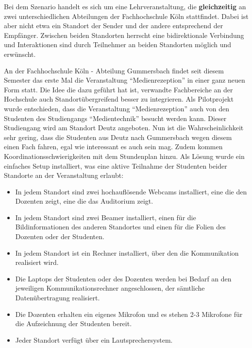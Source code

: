   Bei dem Szenario handelt es sich um eine Lehrveranstaltung, die \textbf{gleichzeitig} an zwei unterschiedlichen Abteilungen der Fachhochschule Köln stattfindet. Dabei ist aber nicht etwa ein Standort der Sender und der andere entsprechend der Empfänger. Zwischen beiden Standorten herrscht eine bidirektionale Verbindung und Interaktionen sind durch Teilnehmer an beiden Standorten möglich und erwünscht.

  An der Fachhochschule Köln - Abteilung Gummersbach findet seit diesem Semester das erste Mal die Veranstaltung "`Medienrezeption"' in einer ganz neuen Form statt. Die Idee die dazu geführt hat ist, verwandte Fachbereiche an der Hochschule auch Standortübergreifend besser zu integrieren. Als Pilotprojekt wurde entschieden, dass die Veranstaltung "`Medienrezeption"' auch von den Studenten des Studiengangs "`Medientechnik"' besucht werden kann. Dieser Studiengang wird am Standort Deutz angeboten. Nun ist die Wahrscheinlichkeit sehr gering, dass die Studenten aus Deutz nach Gummersbach wegen diesem einen Fach fahren, egal wie interessant es auch sein mag. Zudem kommen Koordinationsschwierigkeiten mit dem Stundenplan hinzu. Als Lösung wurde ein einfaches Setup installiert, was eine aktive Teilnahme der Studenten beider Standorte an der Veranstaltung erlaubt:

\begin{itemize}

	\item In jedem Standort sind zwei hochauflösende Webcams installiert, eine die den Dozenten zeigt, eine die das Auditorium zeigt.
	\item In jedem Standort sind zwei Beamer installiert, einen für die Bildinformationen des anderen Standortes und einen für die Folien des Dozenten oder der Studenten.
	\item In jedem Standort ist ein Rechner installiert, über den die Kommunikation realisiert wird.
	\item Die Laptops der Studenten oder des Dozenten werden bei Bedarf an den jeweiligen Kommunikationsrechner angeschlossen, der sämtliche Datenübertragung realisiert.
	\item Die Dozenten erhalten ein eigenes Mikrofon und es stehen 2-3 Mikrofone für die Aufzeichnung der Studenten bereit.
	\item Jeder Standort verfügt über ein Lautsprechersystem.

\end{itemize}

